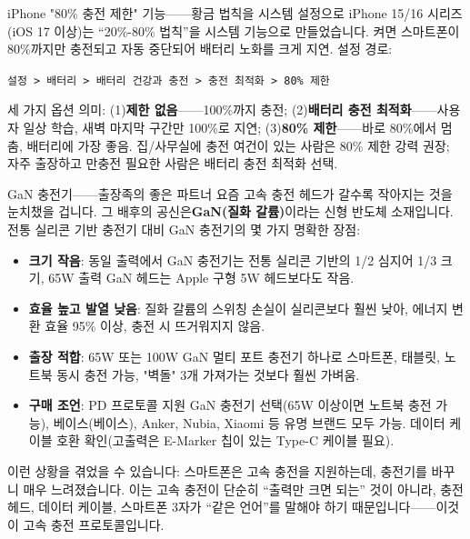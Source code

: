 \begin{tcbinfo}{iPhone "80\% 충전 제한" 기능——황금 법칙을 시스템 설정으로}
iPhone 15/16 시리즈(iOS 17 이상)는 “20\%-80\% 법칙”을 시스템 기능으로 만들었습니다. 켜면 스마트폰이 80\%까지만 충전되고 자동 중단되어 배터리 노화를 크게 지연. 설정 경로:

\texttt{설정 > 배터리 > 배터리 건강과 충전 > 충전 최적화 > 80\% 제한}

세 가지 옵션 의미: (1)\textbf{제한 없음}——100\%까지 충전; (2)\textbf{배터리 충전 최적화}——사용자 일상 학습, 새벽 마지막 구간만 100\%로 지연; (3)\textbf{80\% 제한}——바로 80\%에서 멈춤, 배터리에 가장 좋음. 집/사무실에 충전 여건이 있는 사람은 80\% 제한 강력 권장; 자주 출장하고 만충전 필요한 사람은 배터리 충전 최적화 선택.

\end{tcbinfo}

\begin{tcbinfo}{GaN 충전기——출장족의 좋은 파트너}
요즘 고속 충전 헤드가 갈수록 작아지는 것을 눈치챘을 겁니다. 그 배후의 공신은\textbf{GaN(질화 갈륨)}이라는 신형 반도체 소재입니다. 전통 실리콘 기반 충전기 대비 GaN 충전기의 몇 가지 명확한 장점:

\begin{itemize}
  \item \textbf{크기 작음}: 동일 출력에서 GaN 충전기는 전통 실리콘 기반의 1/2 심지어 1/3 크기, 65W 출력 GaN 헤드는 Apple 구형 5W 헤드보다도 작음.
  \item \textbf{효율 높고 발열 낮음}: 질화 갈륨의 스위칭 손실이 실리콘보다 훨씬 낮아, 에너지 변환 효율 95\% 이상, 충전 시 뜨거워지지 않음.
  \item \textbf{출장 적합}: 65W 또는 100W GaN 멀티 포트 충전기 하나로 스마트폰, 태블릿, 노트북 동시 충전 가능, "벽돌" 3개 가져가는 것보다 훨씬 가벼움.
  \item \textbf{구매 조언}: PD 프로토콜 지원 GaN 충전기 선택(65W 이상이면 노트북 충전 가능), 베이스(베이스), Anker, Nubia, Xiaomi 등 유명 브랜드 모두 가능. 데이터 케이블 호환 확인(고출력은 E-Marker 칩이 있는 Type-C 케이블 필요).
\end{itemize}

\end{tcbinfo}


이런 상황을 겪었을 수 있습니다: 스마트폰은 고속 충전을 지원하는데, 충전기를 바꾸니 매우 느려졌습니다. 이는 고속 충전이 단순히 “출력만 크면 되는” 것이 아니라, 충전 헤드, 데이터 케이블, 스마트폰 3자가 “같은 언어”를 말해야 하기 때문입니다——이것이 고속 충전 프로토콜입니다.

